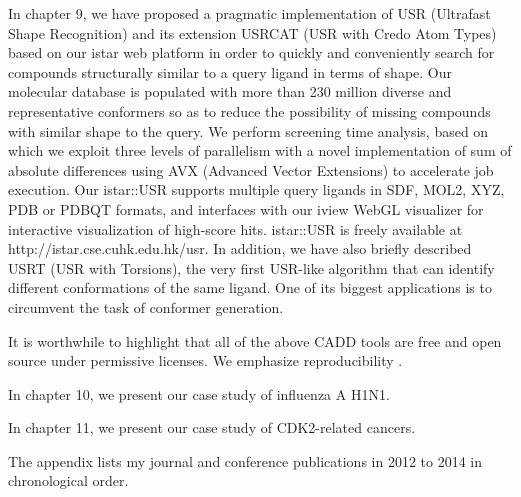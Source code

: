 In chapter 9, we have proposed a pragmatic implementation of USR (Ultrafast Shape Recognition) \citep{1379} and its extension USRCAT (USR with Credo Atom Types) \citep{1331} based on our istar web platform in order to quickly and conveniently search for compounds structurally similar to a query ligand in terms of shape. Our molecular database is populated with more than 230 million diverse and representative conformers so as to reduce the possibility of missing compounds with similar shape to the query. We perform screening time analysis, based on which we exploit three levels of parallelism with a novel implementation of sum of absolute differences using AVX (Advanced Vector Extensions) to accelerate job execution. Our istar::USR supports multiple query ligands in SDF, MOL2, XYZ, PDB or PDBQT formats, and interfaces with our iview WebGL visualizer for interactive visualization of high-score hits. istar::USR is freely available at http://istar.cse.cuhk.edu.hk/usr. In addition, we have also briefly described USRT (USR with Torsions), the very first USR-like algorithm that can identify different conformations of the same ligand. One of its biggest applications is to circumvent the task of conformer generation.

It is worthwhile to highlight that all of the above CADD tools are free and open source under permissive licenses. We emphasize reproducibility \citep{965}.

In chapter 10, we present our case study of influenza A H1N1.

In chapter 11, we present our case study of CDK2-related cancers.

The appendix lists my journal and conference publications in 2012 to 2014 in chronological order.

\chapterend
